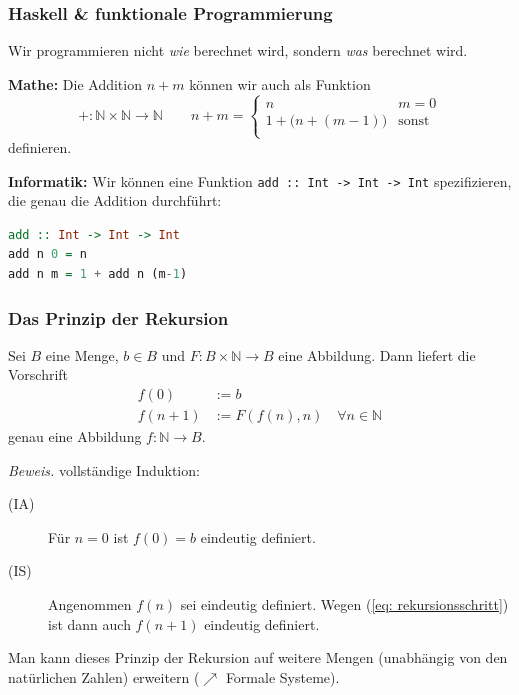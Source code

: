 \documentclass{beamer}
\begin{document}
    \begin{frame}[fragile] \frametitle{Haskell \& funktionale Programmierung}
    	\footnotesize
        
        Wir programmieren nicht \textit{wie} berechnet wird, sondern \textit{was} berechnet wird.
    	
    	\pause
        \medskip
        \textbf{Mathe:} Die Addition $n + m$ können wir auch als Funktion  
        \begin{equation*}
            + \colon \mathbb{N} \times \mathbb{N} \to \mathbb{N} \qquad
            n+m = 
            \begin{cases}
            n & m=0 \\
            1 + \Big( n + (m-1) \Big) &\text{sonst} \\
            \end{cases}
        \end{equation*}
        definieren. \\
       
        \medskip \pause
        
        \textbf{Informatik:} Wir können eine Funktion \lstinline{add :: Int -> Int -> Int} spezifizieren, die genau die Addition durchführt:
        \begin{lstlisting}[language=Haskell]
add :: Int -> Int -> Int
add n 0 = n
add n m = 1 + add n (m-1)
        \end{lstlisting}
    \end{frame}

\begin{frame}\frametitle{Das Prinzip der Rekursion}
	\footnotesize
	\begin{theorem}
		Sei $B$ eine Menge, $b \in B$ und $F \colon B \times \mathbb{N} \to B$ eine Abbildung. Dann liefert die Vorschrift
		\begin{subequations}
			\begin{align}
			f(0) &:= b \\
			f(n+1) &:= F(f(n),n) \quad \forall n \in \mathbb{N} \label{eq: rekursionsschritt}
			\end{align}
		\end{subequations}
		genau eine Abbildung $f : \mathbb{N} \to B$.
	\end{theorem}
	\pause
	
	\emph{Beweis.} \qquad vollständige Induktion:
	\begin{description}
		\item[(IA)] Für $n=0$ ist $f(0) = b$ eindeutig definiert.
		\item[(IS)] Angenommen $f(n)$ sei eindeutig definiert. Wegen (\ref{eq: rekursionsschritt}) ist dann auch $f(n+1)$ eindeutig definiert.
	\end{description}
	
	\bigskip
	
	Man kann dieses Prinzip der Rekursion auf weitere Mengen (unabhängig von den natürlichen Zahlen) erweitern ($\nearrow$ Formale Systeme).
\end{frame}
\end{document}
